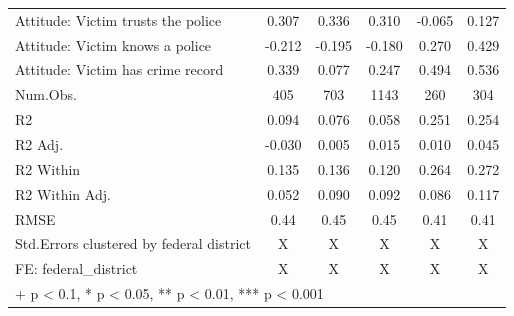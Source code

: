 \begin{tabular}{lccccc}
Attitude: Victim trusts the police & 0.307 & 0.336 & 0.310 & -0.065 & 0.127 \\ 
Attitude: Victim knows a police & -0.212 & -0.195 & -0.180 & 0.270 & 0.429 \\ 
{Attitude: Victim has crime record} & {0.339} & {0.077} & {0.247} & {0.494} & {0.536} \\ 
\midrule
Num.Obs. & 405 & 703 & 1143 & 260 & 304 \\ 
R2 & 0.094 & 0.076 & 0.058 & 0.251 & 0.254 \\ 
R2 Adj. & -0.030 & 0.005 & 0.015 & 0.010 & 0.045 \\ 
R2 Within & 0.135 & 0.136 & 0.120 & 0.264 & 0.272 \\ 
R2 Within Adj. & 0.052 & 0.090 & 0.092 & 0.086 & 0.117 \\ 
RMSE & 0.44 & 0.45 & 0.45 & 0.41 & 0.41 \\ 
Std.Errors clustered by federal district& X & X & X & X & X \\ 
FE: federal\_district & X & X & X & X & X \\ 
\bottomrule
\multicolumn{6}{l}{\small + p < 0.1, * p < 0.05, ** p < 0.01, *** p < 0.001}\\
\end{tabular}
